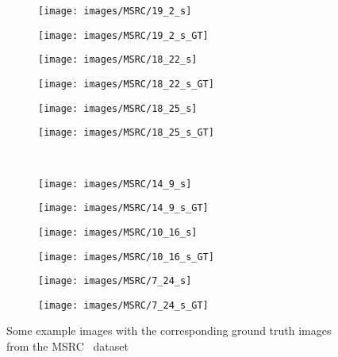 \begin{figure}[t]
 \begin{subfigure}[c]{0.16\textwidth}
  \centering
  \texttt{[image: images/MSRC/19\_2\_s]}
 \end{subfigure}
 \begin{subfigure}[c]{0.16\textwidth}
  \centering
  \texttt{[image: images/MSRC/19\_2\_s\_GT]}
 \end{subfigure}
 \begin{subfigure}[c]{0.16\textwidth}
  \centering
  \texttt{[image: images/MSRC/18\_22\_s]}
 \end{subfigure}
 \begin{subfigure}[c]{0.16\textwidth}
  \centering
  \texttt{[image: images/MSRC/18\_22\_s\_GT]}
 \end{subfigure}
 \begin{subfigure}[c]{0.16\textwidth}
  \centering
  \texttt{[image: images/MSRC/18\_25\_s]}
 \end{subfigure}
 \begin{subfigure}[c]{0.16\textwidth}
  \centering
  \texttt{[image: images/MSRC/18\_25\_s\_GT]}
 \end{subfigure}
 \\
 \begin{subfigure}[c]{0.16\textwidth}
  \centering
  \texttt{[image: images/MSRC/14\_9\_s]}
 \end{subfigure}
 \begin{subfigure}[c]{0.16\textwidth}
  \centering
  \texttt{[image: images/MSRC/14\_9\_s\_GT]}
 \end{subfigure}
 \begin{subfigure}[c]{0.16\textwidth}
  \centering
  \texttt{[image: images/MSRC/10\_16\_s]}
 \end{subfigure}
 \begin{subfigure}[c]{0.16\textwidth}
  \centering
  \texttt{[image: images/MSRC/10\_16\_s\_GT]}
 \end{subfigure}
 \begin{subfigure}[c]{0.16\textwidth}
  \centering
  \texttt{[image: images/MSRC/7\_24\_s]}
 \end{subfigure}
 \begin{subfigure}[c]{0.16\textwidth}
  \centering
  \texttt{[image: images/MSRC/7\_24\_s\_GT]}
 \end{subfigure}
 \caption{Some example images with the corresponding ground truth images from the MSRC~\cite{MSRC} dataset}\label{fig:MSRC_examples}
\end{figure}

